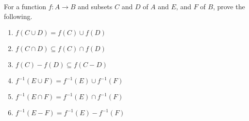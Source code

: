 \documentclass[12pt]{article}
\newenvironment{problem}[2][Problem]{\begin{trivlist} \item[\hskip \labelsep {\bfseries #1}\hskip \labelsep {\bfseries #2.}]}{\end{trivlist}}
\begin{document}
    \begin{problem}{12}
      For a function $f:A\to B$ and subsets $C$ and $D$ of $A$ and $E$, and $F$ of $B$, prove the following.
      \begin{enumerate}[label=(\alph*)]
	\item $f(C\cup D) = f(C)\cup f(D)$
	\item $f(C\cap D) \subseteq f(C)\cap f(D)$
	\item $f(C)-f(D) \subseteq f(C-D)$
	\item $f^{-1}(E\cup F) = f^{-1}(E)\cup f^{-1}(F)$
	\item $f^{-1}(E\cap F) = f^{-1}(E)\cap f^{-1}(F)$
	\item $f^{-1}(E- F) = f^{-1}(E)- f^{-1}(F)$
	
    \end{enumerate}
    \end{problem}
 
\end{document}
